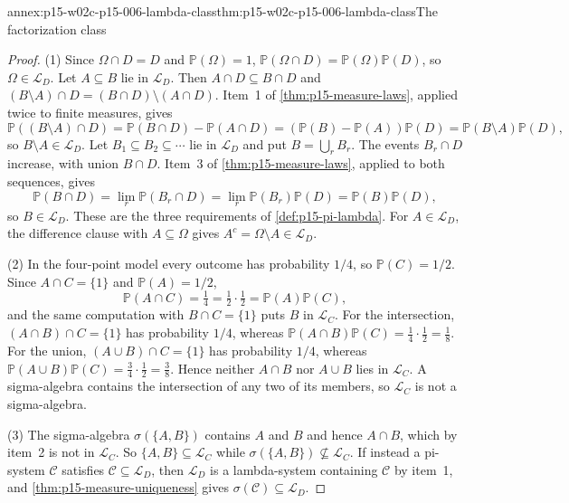 \begin{annexitem}{annex:p15-w02c-p15-006-lambda-class}{thm:p15-w02c-p15-006-lambda-class}{The factorization class}
\begin{proof}
(1) Since \(\Omega\cap D=D\) and \(\mathbb P(\Omega)=1\),
\(\mathbb P(\Omega\cap D)=\mathbb P(\Omega)\mathbb P(D)\), so
\(\Omega\in\mathcal L_D\). Let \(A\subseteq B\) lie in
\(\mathcal L_D\). Then \(A\cap D\subseteq B\cap D\) and
\((B\setminus A)\cap D=(B\cap D)\setminus(A\cap D)\). Item~1 of
\cref{thm:p15-measure-laws}, applied twice to finite measures, gives
\[
 \mathbb P((B\setminus A)\cap D)
   =\mathbb P(B\cap D)-\mathbb P(A\cap D)
   =(\mathbb P(B)-\mathbb P(A))\mathbb P(D)
   =\mathbb P(B\setminus A)\mathbb P(D),
\]
so \(B\setminus A\in\mathcal L_D\). Let
\(B_1\subseteq B_2\subseteq\cdots\) lie in \(\mathcal L_D\) and put
\(B=\bigcup_rB_r\). The events \(B_r\cap D\) increase, with union
\(B\cap D\). Item~3 of \cref{thm:p15-measure-laws}, applied to both
sequences, gives
\[
 \mathbb P(B\cap D)=\lim_r\mathbb P(B_r\cap D)
     =\lim_r\mathbb P(B_r)\mathbb P(D)=\mathbb P(B)\mathbb P(D),
\]
so \(B\in\mathcal L_D\). These are the three requirements of
\cref{def:p15-pi-lambda}. For \(A\in\mathcal L_D\), the difference
clause with \(A\subseteq\Omega\) gives \(A^c=\Omega\setminus A\in\mathcal L_D\).

(2) In the four-point model every outcome has probability \(1/4\), so
\(\mathbb P(C)=1/2\). Since \(A\cap C=\{1\}\) and
\(\mathbb P(A)=1/2\),
\[
 \mathbb P(A\cap C)=\tfrac14=\tfrac12\cdot\tfrac12=\mathbb P(A)\mathbb P(C),
\]
and the same computation with \(B\cap C=\{1\}\) puts \(B\) in
\(\mathcal L_C\). For the intersection,
\((A\cap B)\cap C=\{1\}\) has probability \(1/4\), whereas
\(\mathbb P(A\cap B)\mathbb P(C)=\tfrac14\cdot\tfrac12=\tfrac18\). For
the union, \((A\cup B)\cap C=\{1\}\) has probability \(1/4\), whereas
\(\mathbb P(A\cup B)\mathbb P(C)=\tfrac34\cdot\tfrac12=\tfrac38\). Hence
neither \(A\cap B\) nor \(A\cup B\) lies in \(\mathcal L_C\). A
sigma-algebra contains the intersection of any two of its members, so
\(\mathcal L_C\) is not a sigma-algebra.

(3) The sigma-algebra \(\sigma(\{A,B\})\) contains \(A\) and \(B\) and
hence \(A\cap B\), which by item~2 is not in \(\mathcal L_C\). So
\(\{A,B\}\subseteq\mathcal L_C\) while
\(\sigma(\{A,B\})\not\subseteq\mathcal L_C\). If instead a pi-system
\(\mathcal C\) satisfies \(\mathcal C\subseteq\mathcal L_D\), then
\(\mathcal L_D\) is a lambda-system containing \(\mathcal C\) by
item~1, and \cref{thm:p15-measure-uniqueness} gives
\(\sigma(\mathcal C)\subseteq\mathcal L_D\).
\end{proof}
\end{annexitem}


